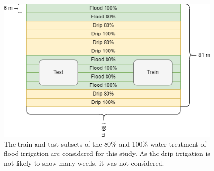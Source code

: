 \documentclass[letterpaper, notitlepage]{report}
\begin{document}
\begin{figure}[h!]
	\centering
	\includegraphics[width=0.8\linewidth]{./figures/test-area.png}
	\caption[Field layout for image acquisition]{The train and test subsets of the 80\% and 100\% water treatment of  flood irrigation are considered for this study. As the drip irrigation is not likely to show many weeds, it was not considered.}
	\label{fig:field-layout}
\end{figure}

\end{document}
